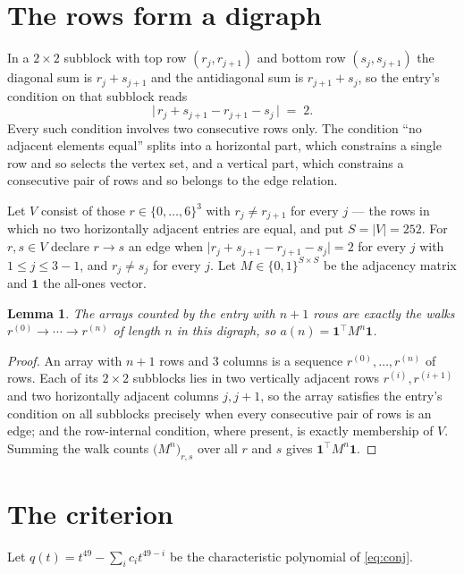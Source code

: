 \documentclass[11pt,a4paper]{article}
\theoremstyle{plain}
\newtheorem{lemma}[theorem]{Lemma}
\theoremstyle{definition}
\begin{document}
\section{The rows form a digraph}

In a $2\times2$ subblock with top row $(r_j,r_{j+1})$ and bottom row $(s_j,s_{j+1})$ the
diagonal sum is $r_j+s_{j+1}$ and the antidiagonal sum is $r_{j+1}+s_j$, so the entry's
condition on that subblock reads
\[
\bigl|\,r_j+s_{j+1}-r_{j+1}-s_j\,\bigr|\;=\;2.
\]
Every such condition involves two consecutive rows only. The condition ``no adjacent elements equal'' splits into a horizontal
part, which constrains a single row and so selects the vertex set, and a vertical part,
which constrains a consecutive pair of rows and so belongs to the edge relation.

Let $V$ consist of those $r\in\{0,\dots,6\}^{3}$ with $r_j\ne r_{j+1}$ for every
$j$ --- the rows in which no two horizontally adjacent entries are equal, and put $S=|V|=252$. For $r,s\in V$ declare $r\to s$ an edge
when $\bigl|r_j+s_{j+1}-r_{j+1}-s_j\bigr|=2$ for every $j$ with
$1\le j\le3-1$, and $r_j\ne s_j$ for every $j$. Let $M\in\{0,1\}^{S\times S}$ be the adjacency matrix and $\mathbf{1}$
the all-ones vector.

\begin{lemma}\label{lem:walk}
The arrays counted by the entry with $n+1$ rows are exactly the walks
$r^{(0)}\to\cdots\to r^{(n)}$ of length $n$ in this digraph, so
$a(n)=\mathbf{1}^{\!\top}M^{n}\mathbf{1}$.
\end{lemma}

\begin{proof}
An array with $n+1$ rows and $3$ columns is a sequence $r^{(0)},\dots,r^{(n)}$ of
rows. Each of its $2\times2$ subblocks lies in two vertically adjacent rows
$r^{(i)},r^{(i+1)}$ and two horizontally adjacent columns $j,j+1$, so the array satisfies
the entry's condition on all subblocks precisely when every consecutive pair of rows is an
edge; and the row-internal condition, where present, is exactly membership of $V$. Summing
the walk counts $\bigl(M^{n}\bigr)_{r,s}$ over all $r$ and $s$ gives
$\mathbf{1}^{\!\top}M^{n}\mathbf{1}$.
\end{proof}

\section{The criterion}

Let $q(t)=t^{49}-\sum_i c_i t^{49-i}$ be the characteristic polynomial of
\eqref{eq:conj}.
\end{document}
